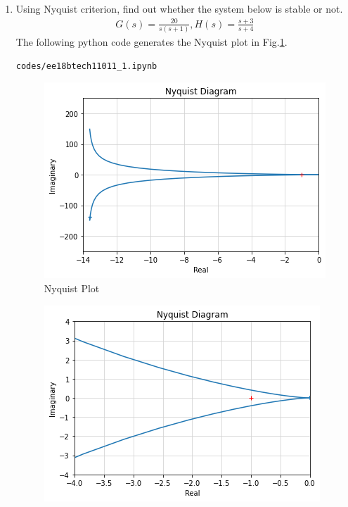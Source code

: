 \begin{enumerate}[label=\thesubsection.\arabic*.,ref=\thesubsection.\theenumi]
\item Using Nyquist criterion, find out whether the system below is stable or not.
\begin{align}
\label{eq:ee18btech11011_system}
 G(s)=\frac{20}{s(s+1)} , 
 H(s)=\frac{s+3}{s+4}
\end{align}
\solution The following python code generates the Nyquist plot in Fig.\ref{fig:ee18btech11011}.
\begin{lstlisting}
codes/ee18btech11011_1.ipynb
\end{lstlisting}
\begin{figure}[ht!]
  \includegraphics[width=\columnwidth]{./figs/ee18btech11011.png}
  \caption{Nyquist Plot}
  \label{fig:ee18btech11011}
\end{figure}
\begin{figure}[ht!]
  \includegraphics[width=\columnwidth]{./figs/zoomed.png}

\end{figure}
\end{enumerate}
